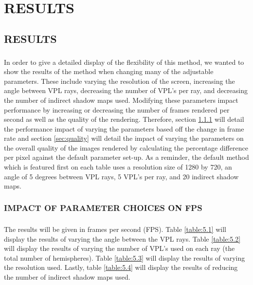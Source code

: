 \chapter{RESULTS}

\section{RESULTS}
\paragraph{}
In order to give a detailed display of the flexibility of this method, we wanted to show the results of the method when changing many of the adjustable parameters.  These include varying the resolution of the screen, increasing the angle between VPL rays, decreasing the number of VPL's per ray, and decreasing the number of indirect shadow maps used. Modifying these parameters impact performance by increasing or decreasing the number of frames rendered per second as well as the quality of the rendering.  Therefore, section \ref{sec:fps} will detail the performance impact of varying the parameters based off the change in frame rate and section \ref{sec:quality} will detail the impact of varying the parameters on the overall quality of the images rendered by calculating the percentage difference per pixel against the default parameter set-up.  As a reminder, the default method which is featured first on each table uses a resolution size of 1280 by 720, an angle of 5 degrees between VPL rays, 5 VPL's per ray, and 20 indirect shadow maps.

\subsection{IMPACT OF PARAMETER CHOICES ON FPS} \label{sec:fps}
\paragraph{}
The results will be given in frames per second (FPS).  Table \ref{table:5.1} will display the results of varying the angle between the VPL rays. Table \ref{table:5.2} will display the results of varying the number of VPL's used on each ray (the total number of hemispheres). Table \ref{table:5.3} will display the results of varying the resolution used.  Lastly, table \ref{table:5.4} will display the results of reducing the number of indirect shadow maps used.

